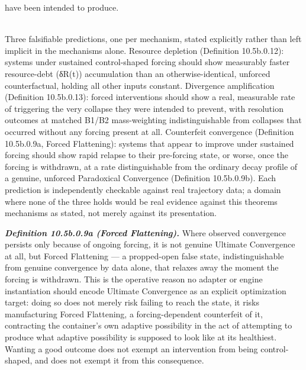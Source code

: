 \documentclass[
]{article}
\begin{document}
have been intended to produce.\\
\strut \\
Three falsifiable predictions, one per mechanism, stated explicitly
rather than left implicit in the mechanisms alone. Resource depletion
(Definition 10.5b.0.12): systems under sustained control-shaped forcing
should show measurably faster resource-debt (δR(t)) accumulation than an
otherwise-identical, unforced counterfactual, holding all other inputs
constant. Divergence amplification (Definition 10.5b.0.13): forced
interventions should show a real, measurable rate of triggering the very
collapse they were intended to prevent, with resolution outcomes at
matched B1/B2 mass-weighting indistinguishable from collapses that
occurred without any forcing present at all. Counterfeit convergence
(Definition 10.5b.0.9a, Forced Flattening): systems that appear to
improve under sustained forcing should show rapid relapse to their
pre-forcing state, or worse, once the forcing is withdrawn, at a rate
distinguishable from the ordinary decay profile of a genuine, unforced
Paradoxical Convergence (Definition 10.5b.0.9b). Each prediction is
independently checkable against real trajectory data; a domain where
none of the three holds would be real evidence against this
theorem\textquotesingle s mechanisms as stated, not merely against its
presentation.

\emph{\textbf{Definition 10.5b.0.9a (Forced Flattening).}} Where
observed convergence persists only because of ongoing forcing, it is not
genuine Ultimate Convergence at all, but Forced Flattening --- a
propped-open false state, indistinguishable from genuine convergence by
data alone, that relaxes away the moment the forcing is withdrawn. This
is the operative reason no adapter or engine instantiation should encode
Ultimate Convergence as an explicit optimization target: doing so does
not merely risk failing to reach the state, it risks manufacturing
Forced Flattening, a forcing-dependent counterfeit of it, contracting
the container's own adaptive possibility in the act of attempting to
produce what adaptive possibility is supposed to look like at its
healthiest. Wanting a good outcome does not exempt an intervention from
being control-shaped, and does not exempt it from this consequence.
\end{document}
